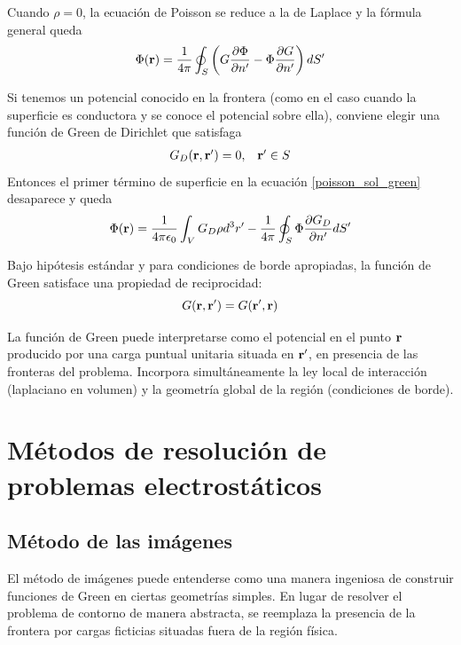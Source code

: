 \documentclass[]{article}
\numberwithin{equation}{section}
\begin{document}
Cuando \(\rho = 0\), la ecuación de Poisson se reduce a la de Laplace y la fórmula general queda
\begin{equation}
	\Phi(\mathbf{r}) = \frac{1}{4\pi}\oint_{S}\left( G\frac{\partial\Phi}{\partial n'} - \Phi\frac{\partial G}{\partial n'} \right)dS'
	\label{laplace_sol_green}
\end{equation}

Si tenemos un potencial conocido en la frontera (como en el caso cuando la superficie es conductora y se conoce el potencial sobre ella), conviene elegir una función de Green de Dirichlet que satisfaga
\begin{equation}
	\begin{matrix}
		G_D(\mathbf{r},\mathbf{r}') = 0,& \mathbf{r}'\in S
	\end{matrix}
	\label{dirichlet}
\end{equation}
Entonces el primer término de superficie en la ecuación \ref{poisson_sol_green} desaparece y queda
\begin{equation}
	\Phi(\mathbf{r}) = \frac{1}{4\pi\epsilon_{0}}\int_{V}G_D\rho d^3r' - \frac{1}{4\pi}\oint_{S}\Phi\frac{\partial G_D}{\partial n'} dS'\label{green_dirichlet}
\end{equation}

Bajo hipótesis estándar y para condiciones de borde apropiadas, la función de Green satisface una propiedad de reciprocidad:
\begin{equation}
	G(\mathbf{r}, \mathbf{r}') = G(\mathbf{r}', \mathbf{r})
\end{equation}

La función de Green puede interpretarse como el potencial en el punto \(\mathbf{r}\) producido por una carga puntual unitaria situada en \(\mathbf{r}'\), en presencia de las fronteras del problema. Incorpora simultáneamente la ley local de interacción (laplaciano en volumen) y la geometría global de la región (condiciones de borde).


\section{Métodos de resolución de problemas electrostáticos}

\subsection{Método de las imágenes}
El método de imágenes puede entenderse como una manera ingeniosa de construir funciones de Green en ciertas geometrías simples. En lugar de resolver el problema de contorno de manera abstracta, se reemplaza la presencia de la frontera por cargas ficticias situadas fuera de la región física.
\end{document}
